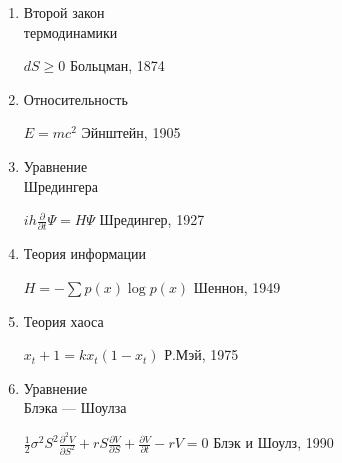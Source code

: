 \documentclass[a4paper, 12pt]{article}
\begin{document}
\begin{enumerate}
   \item \begin{minipage}[t]{45mm} Второй закон \\термодинамики\\ \end{minipage}
  \hfill
 \begin{minipage}[t]{80mm}  $dS \ge 0$ \hfill Больцман, 1874 \end{minipage}
  \item Относительность \hfill \begin{minipage}[t]{80mm} $E = mc^2$ \hfill Эйнштейн, 1905
\end{minipage}

\item\begin{minipage}[t]{45mm} Уравнение \\Шредингера\\ \end{minipage}  \hfill \begin{minipage}[t]{80mm} $ih\frac{\partial}{\partial t}\Psi = H\Psi $
    \hfill Шредингер, 1927 \end{minipage}

 \item Теория информации \hfill
  \begin{minipage}[t]{80mm} $H = - \sum p(x)\log p(x)$ \hfill Шеннон, 1949
   \end{minipage}

 \item Теория хаоса  \hfill \begin{minipage}[t]{80mm} $x_t+1 = kx_t(1-x_t)$  \hfill Р.Мэй, 1975 \end{minipage}
   \item \begin{minipage}[t]{35mm} Уравнение \\Блэка — Шоулза\\ \end{minipage}
  \hfill
  \begin{minipage}[t]{80mm}  $\frac{1}{2}\sigma^2 S^2 \frac{\partial^2 V}{\partial S^2}+rS \frac{\partial V}{\partial S}+\frac{\partial V}{\partial t}-rV = 0$ \hfill Блэк и Шоулз, 1990 \end{minipage}
 
\end{enumerate}
\end{document}
